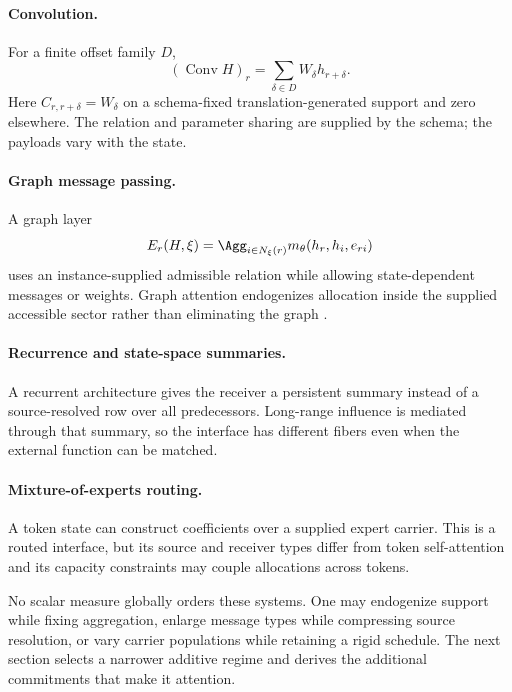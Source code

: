 \paragraph{Convolution.}
For a finite offset family $D$,
\[
(\operatorname{Conv}H)_r
=
\sum_{\delta\in D}W_\delta h_{r+\delta}.
\]
Here $C_{r,r+\delta}=W_\delta$ on a schema-fixed translation-generated support and zero elsewhere. The relation and parameter sharing are supplied by the schema; the payloads vary with the state.

\paragraph{Graph message passing.}
A graph layer
\[
E_r(H,\xi)
=
\Agg_{i\in N_\xi(r)}m_\theta(h_r,h_i,e_{ri})
\]
uses an instance-supplied admissible relation while allowing state-dependent messages or weights. Graph attention endogenizes allocation inside the supplied accessible sector rather than eliminating the graph \citep{velickovic2018graph,bronstein2021geometric}.

\paragraph{Recurrence and state-space summaries.}
A recurrent architecture gives the receiver a persistent summary instead of a source-resolved row over all predecessors. Long-range influence is mediated through that summary, so the interface has different fibers even when the external function can be matched.

\paragraph{Mixture-of-experts routing.}
A token state can construct coefficients over a supplied expert carrier. This is a routed interface, but its source and receiver types differ from token self-attention and its capacity constraints may couple allocations across tokens.

No scalar measure globally orders these systems. One may endogenize support while fixing aggregation, enlarge message types while compressing source resolution, or vary carrier populations while retaining a rigid schedule. The next section selects a narrower additive regime and derives the additional commitments that make it attention.

